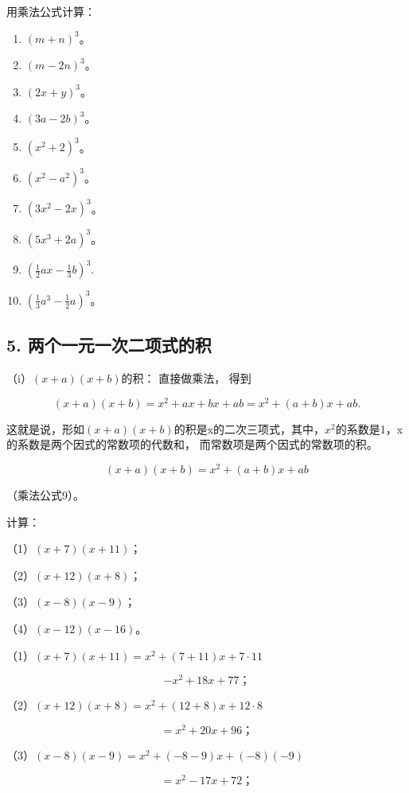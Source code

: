 用乘法公式计算：

\begin{enumerate}[start=1]
\item
  \((m + n)^{3}\)。
\item
  \((m - 2n)^{3}\)。
\item
  \((2x + y)^{3}\)。
\item
  \((3a - 2b)^{3}\)。
\item
  \((x^{2} + 2)^{3}\)。
\item
  \((x^{2} - a^{2})^{3}\)。
\item
  \((3x^{2} - 2x)^{3}\)。
\item
  \((5x^{3} + 2a)^{3}\)。
\item
  \(\left(\frac{1}{2} ax - \frac{1}{3} b\right)^3.\)
\item
  \(\left(\frac{1}{3} a^3 - \frac{1}{2} a\right)^3\)。
\end{enumerate}

\subsection{5. 两个一元一次二项式的积}

（i）\((x + a)(x + b)\)的积： 直接做乘法， 得到

\[
(x + a) (x + b) = x ^{2} + a x + b x + a b = x ^{2} + (a + b) x + a b.
\]

这就是说，形如\((x+a)(x+b)\)的积是x的二次三项式，其中，\(x^{2}\)的系数是1，x的系数是两个因式的常数项的代数和，
而常数项是两个因式的常数项的积。

\[
(x + a) (x + b) = x ^{2} + (a + b) x + a b
\]

（乘法公式9）。


计算：

（1）\((x + 7)(x + 11)\)；

（2）\((x + 12)(x + 8)\)；

（3）\((x - 8)(x - 9)\)；

（4）\((x-12)(x-16)\)。

 （1）\((x + 7)(x + 11) = x^2 + (7 + 11)x + 7 \cdot 11\)

\[
- x ^{2} + 18 x + 77\text{；}
\]

（2）\((x + 12)(x + 8) = x^2 +(12 + 8)x + 12\cdot 8\)

\[
= x ^{2} + 20 x + 96\text{；}
\]

（3）\((x - 8)(x - 9) = x^2 + (-8 - 9)x + (-8)(-9)\)

\[
= x ^{2} - 17 x + 72\text{；}
\]

